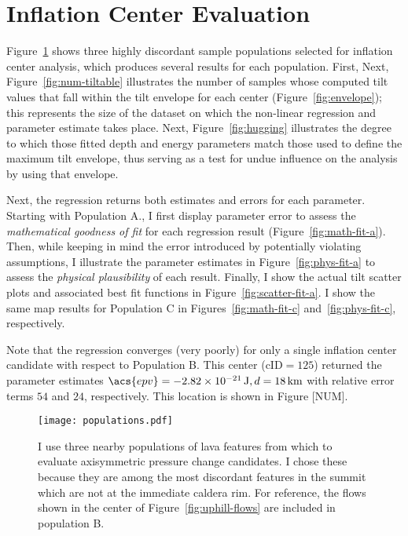 \section{Inflation Center Evaluation}

Figure~\ref{fig:populations} shows three highly discordant sample populations selected for inflation center analysis, which produces several results for each population. First, Next, Figure~\ref{fig:num-tiltable} illustrates the number of samples whose computed tilt values that fall within the tilt envelope for each center (Figure~\ref{fig:envelope}); this represents the size of the dataset on which the non-linear regression and parameter estimate takes place. Next, Figure~\ref{fig:hugging} illustrates the degree to which those fitted depth and energy parameters match those used to define the maximum tilt envelope, thus serving as a test for undue influence on the analysis by using that envelope.

Next, the regression returns both estimates and errors for each parameter. Starting with Population A., I first display parameter error to assess the  \emph{mathematical goodness of fit} for each regression result (Figure~\ref{fig:math-fit-a}). Then, while keeping in mind the error introduced by potentially violating \textcite{mogi_relations_1958} assumptions, I illustrate the parameter estimates in Figure~\ref{fig:phys-fit-a} to assess the \emph{physical plausibility} of each result. Finally, I show the actual tilt scatter plots and associated best fit functions in Figure~\ref{fig:scatter-fit-a}. I show the same map results for Population C in Figures~\ref{fig:math-fit-c} and~\ref{fig:phys-fit-c}, respectively.

Note that the regression converges (very poorly) for only a single inflation center candidate with respect to Population B. This center ($\text{cID} = 125$) returned the parameter estimates $\acs{epv}=\qty{-2.82e-21}{\J}, d=\qty{18}{\km}$ with relative error terms $54$ and $24$, respectively. This location is shown in Figure [NUM].

\begin{figure}
    \texttt{[image: populations.pdf]}%
    \caption[Sample populations for inflation center evaluation]{I use three nearby populations of lava features from which to evaluate axisymmetric pressure change candidates. I chose these because they are among the most discordant features in the summit which are not at the immediate caldera rim. For reference, the flows shown in the center of Figure~\ref{fig:uphill-flows} are included in population B.}%
    \label{fig:populations}
\end{figure}

